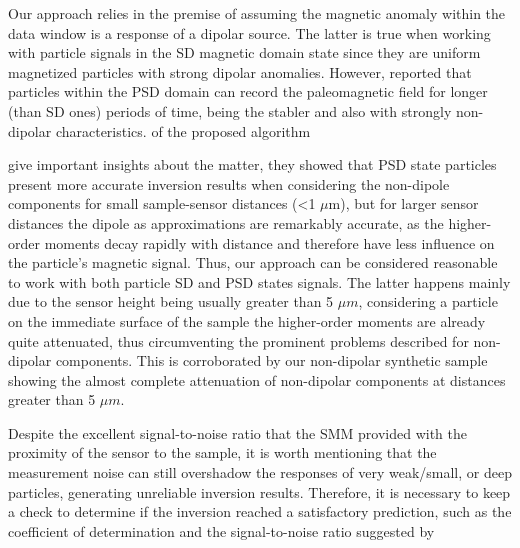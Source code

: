Our approach relies in the premise of assuming the magnetic anomaly within
the data window is a response of a dipolar source.
The latter is true when working
with particle signals in the SD magnetic domain state since they are uniform magnetized particles \DIFaddbegin {}\DIFaddend with strong dipolar anomalies.
However, \cite{Nagy2017} reported that particles within the PSD domain can record the paleomagnetic field for longer (than SD ones) periods of time, being the stabler and also with strongly non-dipolar characteristics.
\DIFdelbegin {}\DIFdelend \DIFaddbegin {}\DIFaddend of the proposed algorithm \DIFdelbegin {}\DIFdelend \DIFaddbegin {}

\DIFaddend \cite{CortesOrtuno2022} give important insights about the matter, they showed that PSD state particles present more accurate inversion results when considering the non-dipole components for small sample-sensor distances (\textless 1 $\mu$m), but for larger sensor distances the dipole as approximations are remarkably accurate, as the higher-order moments decay rapidly with distance and therefore have less
influence on the particle's magnetic signal.
Thus, our approach can be considered reasonable to work with both particle SD and PSD states signals.
The latter happens mainly due to the sensor height being usually greater than 5 $\mu m$, considering a particle on the immediate surface of the sample the higher-order moments are already quite attenuated, thus circumventing the prominent problems described for non-dipolar components. This is corroborated by our non-dipolar synthetic sample showing the almost complete attenuation of non-dipolar components at distances greater than 5 $\mu m$.

Despite the excellent signal-to-noise ratio that the SMM provided with the
proximity of the sensor to the sample, it is worth mentioning that the
measurement noise can still overshadow the responses of very weak/small, or
deep particles, generating unreliable inversion results.
Therefore, it is necessary to keep a check to determine if the inversion reached a satisfactory prediction, such as the coefficient of determination \DIFaddbegin {}\DIFaddend and the
signal-to-noise ratio suggested by \DIFdelbegin {}%

